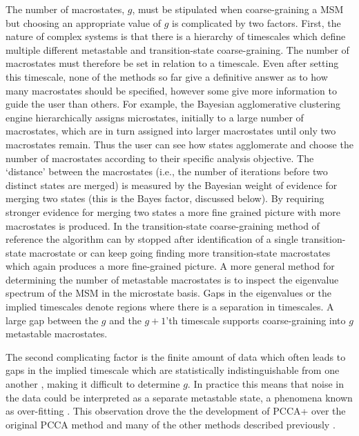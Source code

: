 The number of macrostates, $g$, must be stipulated when coarse-graining a MSM but choosing an appropriate value of $g$ is complicated by two factors. First, the nature of complex systems is that there is a hierarchy of timescales \cite{frauenfelderEnergyLandscapesMotions1991, henzler-wildmanDynamicPersonalitiesProteins2007} which define multiple different metastable and transition-state coarse-graining. The number of macrostates must therefore be set in relation to a timescale. Even after setting this timescale, none of the methods so far give a definitive answer as to how many macrostates should be specified, however some give more information to guide the user than others. For example, the Bayesian agglomerative clustering engine \cite{bowmanImprovedCoarsegrainingMarkov2012a} hierarchically assigns microstates, initially to a large number of  macrostates, which are in turn assigned into larger macrostates until only two macrostates remain. Thus the user can see how states agglomerate and choose the number of macrostates according to their specific analysis objective. The `distance' between the macrostates (i.e., the number of iterations before two distinct states are merged) is measured by the Bayesian weight of evidence for merging two states (this is the Bayes factor, discussed below).  By requiring stronger evidence for merging two states a more fine grained picture with more macrostates is produced.  In the transition-state coarse-graining method of reference \cite{martiniVariationalIdentificationMarkovian2017} the algorithm can by stopped after identification of a single transition-state macrostate or can keep going finding more transition-state macrostates which again produces a more fine-grained picture.  A more general method for determining the number of metastable macrostates is to inspect the eigenvalue spectrum of the MSM in the microstate basis.  Gaps in the eigenvalues or the implied timescales \cite{noeProjectedHiddenMarkov2013a} denote regions where there is a separation in timescales. A large gap between the $g$ and the $g+1$'th timescale supports coarse-graining into $g$ metastable macrostates. 

The second complicating factor is the finite amount of data which often leads to gaps in the implied timescale which are statistically indistinguishable from one another \cite{bowmanQuantitativeComparisonAlternative2013}, making it difficult to determine $g$.  In practice this means that noise in the data could be interpreted as a separate metastable state, a phenomena known as over-fitting \cite[chapter 6]{friedman2001elements}. This observation drove the the development of PCCA+ over the original PCCA method \cite{deuflhardRobustPerronCluster2005b} and many of the other methods described previously \cite{bowmanQuantitativeComparisonAlternative2013}.  

